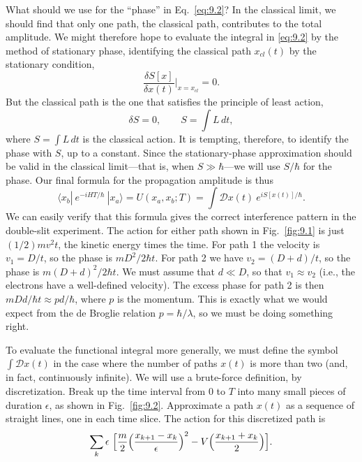 What should we use for the ``phase'' in Eq.~\eqref{eq:9.2}?  In the classical
limit, we should find that only one path, the classical path, contributes to
the total amplitude.  We might therefore hope to evaluate the integral in
\eqref{eq:9.2} by the method of stationary phase, identifying the classical
path $x_{cl}(t)$ by the stationary condition,
\begin{equation}
  \frac{\delta S[x]}{\delta x(t)}\Big|_{x=x_{cl}} = 0 .
\end{equation}
But the classical path is the one that satisfies the principle of least
action,
\begin{equation}
  \delta S = 0,\qquad S = \int L\,dt ,
\end{equation}
where $S = \int L\,dt$ is the classical action.  It is tempting, therefore, to
identify the phase with $S$, up to a constant.  Since the stationary-phase
approximation should be valid in the classical limit---that is, when
$S \gg \hbar$---we will use $S/\hbar$ for the phase.  Our final formula for the
propagation amplitude is thus
\begin{equation}
  \langle x_b|\ e^{-iHT/\hbar}\ |x_a\rangle = U(x_a, x_b; T)
  = \int \mathcal{D}x(t)\ e^{iS[x(t)]/\hbar} .
  \label{eq:9.3}
\end{equation}
We can easily verify that this formula gives the correct interference pattern
in the double-slit experiment.  The action for either path shown in
Fig.~\ref{fig:9.1} is just $(1/2)mv^2t$, the kinetic energy times the time.
For path 1 the velocity is $v_1 = D/t$, so the phase is $mD^2/2\hbar t$.  For
path 2 we have $v_2 = (D+d)/t$, so the phase is $m(D+d)^2/2\hbar t$.  We must
assume that $d \ll D$, so that $v_1 \approx v_2$ (i.e., the electrons have a
well-defined velocity).  The excess phase for path 2 is then
$mDd/\hbar t \approx pd/\hbar$, where $p$ is the momentum.  This is exactly
what we would expect from the de Broglie relation $p = \hbar/\lambda$, so we
must be doing something right.

To evaluate the functional integral more generally, we must define the symbol
$\int\mathcal{D}x(t)$ in the case where the number of paths $x(t)$ is more
than two (and, in fact, continuously infinite).  We will use a brute-force
definition, by discretization.  Break up the time interval from 0 to $T$ into
many small pieces of duration $\epsilon$, as shown in Fig.~\ref{fig:9.2}.
Approximate a path $x(t)$ as a sequence of straight lines, one in each time
slice.  The action for this discretized path is
\begin{equation}
  \sum_k \epsilon\ \Bigl[ \frac{m}{2}\Bigl( \frac{x_{k+1}-x_k}{\epsilon}
    \Bigr)^2 - V\Bigl( \frac{x_{k+1}+x_k}{2} \Bigr) \Bigr] .
\end{equation}

